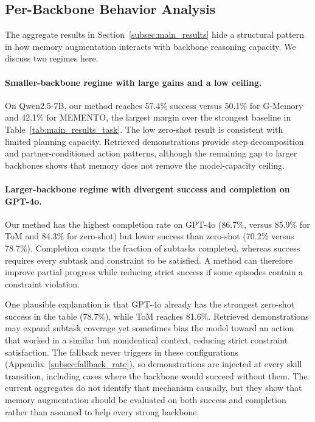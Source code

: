\documentclass{article}
\theoremstyle{plain}
\theoremstyle{definition}
\theoremstyle{remark}
\begin{document}
\subsection{Per-Backbone Behavior Analysis}
\label{sec:per_backbone}

The aggregate results in Section~\ref{subsec:main_results} hide a structural pattern in how memory augmentation interacts with backbone reasoning capacity. We discuss two regimes here.

\paragraph{Smaller-backbone regime with large gains and a low ceiling.} On Qwen2.5-7B, our method reaches 57.4\% success versus 50.1\% for G-Memory and 42.1\% for MEMENTO, the largest margin over the strongest baseline in Table~\ref{tab:main_results_task}. The low zero-shot result is consistent with limited planning capacity. Retrieved demonstrations provide step decomposition and partner-conditioned action patterns, although the remaining gap to larger backbones shows that memory does not remove the model-capacity ceiling.

\paragraph{Larger-backbone regime with divergent success and completion on GPT-4o.} Our method has the highest completion rate on GPT-4o (86.7\%, versus 85.9\% for ToM and 84.3\% for zero-shot) but lower success than zero-shot (70.2\% versus 78.7\%). Completion counts the fraction of subtasks completed, whereas success requires every subtask and constraint to be satisfied. A method can therefore improve partial progress while reducing strict success if some episodes contain a constraint violation.

One plausible explanation is that GPT-4o already has the strongest zero-shot success in the table (78.7\%), while ToM reaches 81.6\%. Retrieved demonstrations may expand subtask coverage yet sometimes bias the model toward an action that worked in a similar but nonidentical context, reducing strict constraint satisfaction. The fallback never triggers in these configurations (Appendix~\ref{subsec:fallback_rate}), so demonstrations are injected at every skill transition, including cases where the backbone would succeed without them. The current aggregates do not identify that mechanism causally, but they show that memory augmentation should be evaluated on both success and completion rather than assumed to help every strong backbone.
\end{document}
